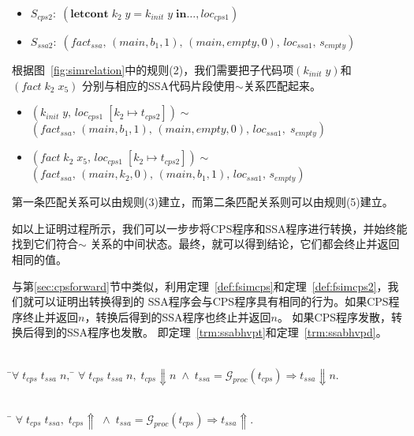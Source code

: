 \begin{itemize}
    \item $S_{cps2}:\; (\mathbf{letcont}\; k_2\; y=k_{init}\; y\; \mathbf{in}\dots, loc_{cps1})$
    \item $S_{ssa2}:\; (fact_{ssa},\, (main, b_1, 1),\, (main, empty, 0),\, loc_{ssa1},\, s_{empty})$
\end{itemize}

根据图~\ref{fig:simrelation}中的规则(2)，我们需要把子代码项$(k_{init}\; y)$和$(fact\; k_2\; x_5)$
分别与相应的SSA代码片段使用$\sim$关系匹配起来。

\begin{itemize}
    \item $(k_{init}\; y,\, loc_{cps1}\; [k_2\mapsto t_{cps2}])\sim $ \\ $(fact_{ssa},\, (main, b_1, 1),\, (main, empty, 0),\, loc_{ssa1},\; s_{empty})$
    \item $ (fact\; k_2\; x_5,\, loc_{cps1}\; [k_2\mapsto t_{cps2}])\sim $ \\ $(fact_{ssa},\, (main, k_2, 0),\, (main, b_1,1),\, loc_{ssa1},\, s_{empty})$
\end{itemize}

第一条匹配关系可以由规则(3)建立，而第二条匹配关系则可以由规则(5)建立。

如以上证明过程所示，我们可以一步步将CPS程序和SSA程序进行转换，并始终能找到它们符合$\sim$
关系的中间状态。最终，就可以得到结论，它们都会终止并返回相同的值。

与第\ref{sec:cpsforward}节中类似，利用定理~\ref{def:fsimcps}和定理~\ref{def:fsimcps2}，我们就可以证明出转换得到的
SSA程序会与CPS程序具有相同的行为。如果CPS程序终止并返回$n$，转换后得到的SSA程序也终止并返回$n$。
如果CPS程序发散，转换后得到的SSA程序也发散。
即定理~\ref{trm:ssabhvpt}和定理~\ref{trm:ssabhvpd}。

\begin{theorem}[SSA程序对CPS程序终止行为的保存]\label{trm:ssabhvpt} 
    \begin{tabbing}
     \\
    \quad\=$\forall \; t_{cps}\; t_{ssa}\; n,\; $\=\kill
    \>$\forall \; t_{cps}\; t_{ssa}\; n,\; t_{cps}\Downarrow n\; \wedge \; t_{ssa}=\mathcal{G}_{proc}(t_{cps}) \Longrightarrow t_{ssa}\Downarrow n.$
    \end{tabbing}
  \end{theorem}
  
  \begin{theorem}[SSA程序对CPS程序发散行为的保存]\label{trm:ssabhvpd}
    \begin{tabbing}
      \\
    \quad\=\kill
    \>$\forall \; t_{cps}\; t_{ssa},\; t_{cps}\Uparrow\; \wedge \; t_{ssa}=\mathcal{G}_{proc}(t_{cps})\Longrightarrow t_{ssa}\Uparrow.$
    \end{tabbing}
  \end{theorem}

